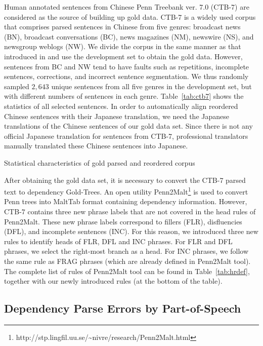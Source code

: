 \documentclass[english]{jnlp_1.4}
\begin{document}
Human annotated sentences from Chinese Penn Treebank ver. 7.0 (CTB-7) are considered 
as the source of building up gold data. CTB-7 is a widely used corpus that comprises 
parsed sentences in Chinese from five genres: broadcast news (BN), broadcast 
conversations (BC), news magazines (NM), newswire (NS), and newsgroup weblogs 
(NW). We divide the corpus in the same manner as that introduced in \cite{YW2011} 
and use the development set to obtain the gold data. 
However, sentences from BC and NW tend to have faults such as repetitions, incomplete 
sentences, corrections, and incorrect sentence segmentation. We thus randomly 
sampled $2,643$ unique sentences from all five genres in the development set, 
but with different numbers of sentences in each genre. Table~\ref{tab:ctb7} shows 
the statistics of all selected sentences.
In order to automatically align reordered Chinese sentences with their Japanese translation,
we need the Japanese translations of the Chinese sentences of our gold data set.
Since there is not any official Japanese translation for sentences from CTB-7,
professional translators manually translated these Chinese sentences into Japanese.

\begin{table}[b]
\caption{Statistical characteristics of gold parsed and reordered corpus} 
\label{tab:ctb7}
\vspace{8pt}

\end{table}

After obtaining the gold data set, it is necessary to convert the CTB-7 parsed text 
to dependency Gold-Trees. An open utility Penn2Malt\footnote{http://stp.lingfil.uu.se/{\textasciitilde}nivre/research/Penn2Malt.html} 
is used to convert Penn trees into MaltTab format containing dependency information. 
However, CTB-$7$ contains three new phrase labels that are not covered in the head rules of Penn2Malt.
These new phrase labels correspond to fillers (FLR), disfluencies (DFL), and incomplete sentences (INC).
For this reason, we introduced three new rules to identify heads of FLR, DFL and INC phrases.
For FLR and DFL phrases, we select the right-most branch as a head.
For INC phrases, we follow the same rule as FRAG phrases (which are already defined in Penn2Malt tool).
The complete list of rules of Penn2Malt tool can be found in Table~\ref{tab:hrdef},
together with our newly introduced rules (at the bottom of the table).


\subsection{Dependency Parse Errors by Part-of-Speech}
\label{subsec:pos}
\end{document}
